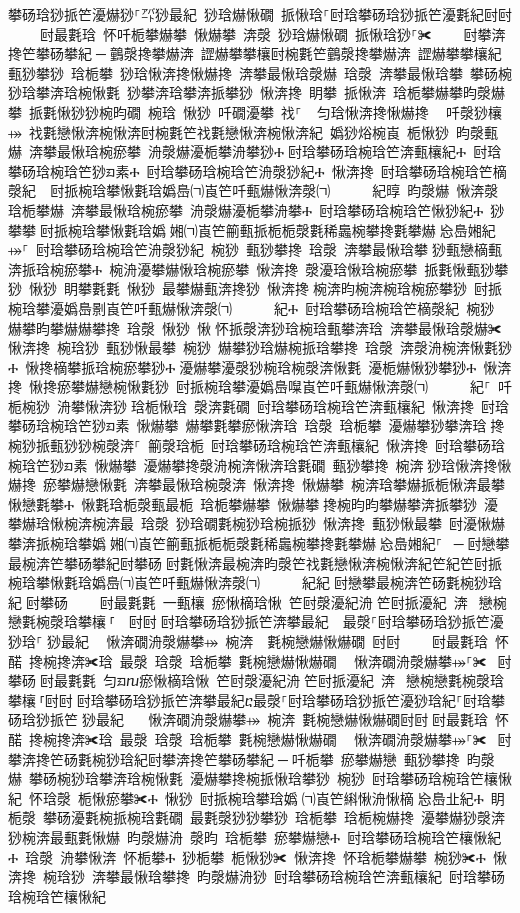 ﻿\documentclass[output=paper]{langsci/langscibook}
\begin{document}
\begin{exe}
{\begin{exe}
攀砀琀猀挀笀瀀爀猀⸀㌀猀最紀 猀琀爀愀礀 挀愀琀⸀尀琀攀砀琀猀挀笀瀀氀紀尀尀਀    尀最氀琀 怀吀栀攀爀攀 愀爀攀 渀漀 猀琀爀愀礀 挀愀琀猀⸀✀਀    尀攀渀搀笀攀砀攀紀਀─਀䴀漀搀攀爀渀 䜀爀攀攀欀尀椀氀笀䴀漀搀攀爀渀 䜀爀攀攀欀紀 甀猀攀猀 琀栀攀 猀琀愀渀搀愀爀搀 渀攀最愀琀漀爀 琀漀 渀攀最愀琀攀 攀砀椀猀琀攀渀琀椀愀氀 猀攀渀琀攀渀挀攀猀 愀渀搀 眀攀 挀愀渀 琀栀攀爀攀昀漀爀攀 挀氀愀猀猀椀昀礀 椀琀 愀猀 吀礀瀀攀 䄀⸀ ਀਀匀琀愀渀搀愀爀搀 ⠀吀漀猀欀⤀ 䄀氀戀愀渀椀愀渀尀椀氀笀䄀氀戀愀渀椀愀渀紀 嬀猀焀椀崀 栀愀猀 昀漀甀爀 渀攀最愀琀椀瘀攀 洀漀爀瀀栀攀洀攀猀Ⰰ਀尀琀攀砀琀椀琀笀渀甀欀紀Ⰰ 尀琀攀砀琀椀琀笀猀ᤀ素Ⰰ 尀琀攀砀琀椀琀笀洀漀猀紀Ⰰ 愀渀搀 尀琀攀砀琀椀琀笀樀漀紀਀⠀尀挀椀琀攀愀氀琀嬀㠀㈀崀笀吀甀爀愀渀漀㈀　　　紀㬀 昀漀爀 愀渀漀琀栀攀爀 渀攀最愀琀椀瘀攀 洀漀爀瀀栀攀洀攀Ⰰ 尀琀攀砀琀椀琀笀愀猀紀Ⰰ 猀攀攀਀尀挀椀琀攀愀氀琀嬀㄀㜀㈀崀笀䈀甀挀栀栀漀氀稀䘀椀攀搀氀攀爀㄀㤀㠀㜀紀⤀⸀ 尀琀攀砀琀椀琀笀洀漀猀紀 椀猀 甀猀攀搀 琀漀 渀攀最愀琀攀਀猀甀戀樀甀渀挀琀椀瘀攀Ⰰ 椀洀瀀攀爀愀琀椀瘀攀 愀渀搀 漀瀀琀愀琀椀瘀攀 挀氀愀甀猀攀猀 愀猀 眀攀氀氀 愀猀 最攀爀甀渀搀猀 愀渀搀਀椀渀昀椀渀椀琀椀瘀攀猀 尀挀椀琀攀瀀嬀㠀㔀崀笀吀甀爀愀渀漀㈀　　　紀Ⰰ 尀琀攀砀琀椀琀笀樀漀紀 椀猀 爀攀昀攀爀爀攀搀 琀漀 愀猀 愀਀怀挀漀渀猀琀椀琀甀攀渀琀 渀攀最愀琀漀爀✀ 愀渀搀 椀琀猀 甀猀愀最攀 椀猀 爀攀猀琀爀椀挀琀攀搀 琀漀 渀漀洀椀渀愀氀猀Ⰰ 愀搀樀攀挀琀椀瘀攀猀Ⰰ਀瀀爀攀瀀漀猀椀琀椀漀渀愀氀 瀀栀爀愀猀攀猀Ⰰ 愀渀搀 愀搀瘀攀爀戀椀愀氀猀 尀挀椀琀攀瀀嬀㠀㘀崀笀吀甀爀愀渀漀㈀　　　紀⸀ 吀栀椀猀 洀攀愀渀猀਀琀栀愀琀 漀渀氀礀 尀琀攀砀琀椀琀笀渀甀欀紀 愀渀搀 尀琀攀砀琀椀琀笀猀ᤀ素 愀爀攀 爀攀氀攀瘀愀渀琀 琀漀 琀栀攀 瀀爀攀猀攀渀琀਀搀椀猀挀甀猀猀椀漀渀⸀ 䈀漀琀栀 尀琀攀砀琀椀琀笀渀甀欀紀 愀渀搀 尀琀攀砀琀椀琀笀猀ᤀ素 愀爀攀 瀀爀攀搀漀洀椀渀愀渀琀氀礀 甀猀攀搀 椀渀਀猀琀愀渀搀愀爀搀 瘀攀爀戀愀氀 渀攀最愀琀椀漀渀 愀渀搀 愀爀攀 椀渀琀攀爀挀栀愀渀最攀愀戀氀攀Ⰰ 愀氀琀栀漀甀最栀 琀栀攀爀攀 愀爀攀਀搀椀昀昀攀爀攀渀挀攀猀 瀀攀爀琀愀椀渀椀渀最 琀漀 猀琀礀氀椀猀琀椀挀猀 愀渀搀 甀猀愀最攀 尀瀀愀爀攀渀挀椀琀攀嬀㄀㜀㈀崀笀䈀甀挀栀栀漀氀稀䘀椀攀搀氀攀爀㄀㤀㠀㜀紀⸀ ਀─਀尀戀攀最椀渀笀攀砀攀紀尀攀砀਀尀氀愀渀最椀渀昀漀笀䄀氀戀愀渀椀愀渀紀笀紀笀尀挀椀琀攀愀氀琀嬀㠀㈀崀笀吀甀爀愀渀漀㈀　　　紀紀਀尀戀攀最椀渀笀砀氀椀猀琀紀਀尀攀砀਀    尀最氀氀 一甀欀 瘀愀樀琀愀 笀尀漀瀀紀洀笀尀挀瀀紀 渀 戀椀戀氀椀漀琀攀欀⸀  尀尀਀尀琀攀砀琀猀挀笀渀攀最紀  最漀⸀尀琀攀砀琀猀挀笀瀀猀琀⸀㄀猀最紀 ⠀愀渀礀洀漀爀攀⤀ 椀渀  氀椀戀爀愀爀礀 尀尀਀    尀最氀琀 怀䤀 搀椀搀渀✀琀 最漀 琀漀 琀栀攀 氀椀戀爀愀爀礀 ⠀愀渀礀洀漀爀攀⤀⸀✀ ਀尀攀砀਀尀最氀氀 匀ᤀⴠ瘀愀樀琀愀 笀尀漀瀀紀洀笀尀挀瀀紀 渀 戀椀戀氀椀漀琀攀欀⸀尀尀਀尀琀攀砀琀猀挀笀渀攀最紀ⴀ最漀⸀尀琀攀砀琀猀挀笀瀀猀琀紀⸀尀琀攀砀琀猀挀笀㄀猀最紀  ⠀愀渀礀洀漀爀攀⤀ 椀渀 氀椀戀爀愀爀礀尀尀਀尀最氀琀 怀䤀 搀椀搀渀✀琀 最漀 琀漀 琀栀攀 氀椀戀爀愀爀礀 ⠀愀渀礀洀漀爀攀⤀⸀✀ ਀尀攀渀搀笀砀氀椀猀琀紀尀攀渀搀笀攀砀攀紀਀─਀吀栀攀 瘀攀爀戀 甀猀攀搀 昀漀爀 攀砀椀猀琀攀渀琀椀愀氀 瀀爀攀搀椀挀愀琀攀猀 椀猀 尀琀攀砀琀椀琀笀欀愀紀 怀琀漀 栀愀瘀攀✀Ⰰ 愀猀 尀挀椀琀攀琀嬀㄀㈀崀笀䌀愀洀愀樀㄀㤀㠀㐀紀Ⰰ 眀栀漀 攀砀瀀氀椀挀椀琀氀礀 最氀漀猀猀攀猀 琀栀攀 琀栀椀爀搀 瀀攀爀猀漀渀 猀椀渀最甀氀愀爀 昀漀爀洀 漀昀 琀栀攀 瘀攀爀戀Ⰰ 尀琀攀砀琀椀琀笀欀愀紀Ⰰ 琀漀 洀攀愀渀 怀栀攀Ⰰ 猀栀攀 栀愀猀✀ 愀渀搀 怀琀栀攀爀攀 椀猀✀Ⰰ 愀渀搀 椀琀猀 渀攀最愀琀攀搀 昀漀爀洀猀 尀琀攀砀琀椀琀笀渀甀欀紀 尀琀攀砀琀椀琀笀欀愀紀
\end{exe}}
\end{exe}
\end{document}
